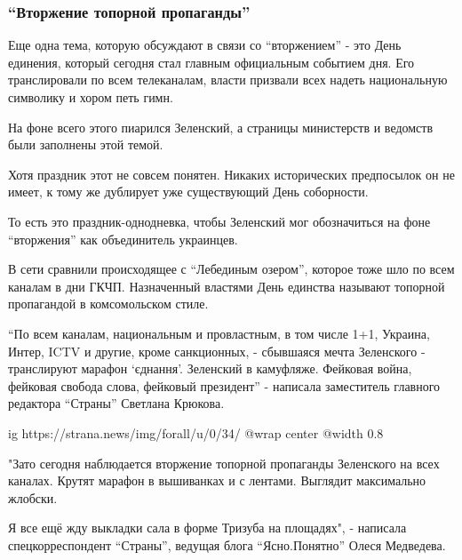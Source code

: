  
 
 
 
 

\subsubsection{\enquote{Вторжение топорной пропаганды}}
\label{sec:16_02_2022.stz.news.ua.strana.4.putin_ne_napal.4.vtorzhenie_propagandy}

Еще одна тема, которую обсуждают в связи со \enquote{вторжением} - это День единения,
который сегодня стал главным официальным событием дня. Его транслировали по
всем телеканалам, власти призвали всех надеть национальную символику и хором
петь гимн.

На фоне всего этого пиарился Зеленский, а страницы министерств и ведомств были
заполнены этой темой. 

Хотя праздник этот не совсем понятен. Никаких исторических предпосылок он не
имеет, к тому же дублирует уже существующий День соборности. 

То есть это праздник-однодневка, чтобы Зеленский мог обозначиться на фоне
\enquote{вторжения} как объединитель украинцев. 

В сети сравнили происходящее с \enquote{Лебединым озером}, которое тоже шло по всем
каналам в дни ГКЧП. Назначенный властями День единства называют топорной
пропагандой в комсомольском стиле.

\enquote{По всем каналам, национальным и провластным, в том числе 1+1, Украина, Интер,
ICTV и другие, кроме санкционных, - сбывшаяся мечта Зеленского - транслируют
марафон \enquote{єднання}. Зеленский в камуфляже. Фейковая война, фейковая свобода
слова, фейковый президент} - написала заместитель главного редактора \enquote{Страны}
Светлана Крюкова.

\ifcmt
  ig https://strana.news/img/forall/u/0/34/%
  @wrap center
  @width 0.8
\fi

"Зато сегодня наблюдается вторжение топорной пропаганды Зеленского на всех
каналах. Крутят марафон в вышиванках и с лентами. Выглядит максимально жлобски.

Я все ещё жду выкладки сала в форме Тризуба на площадях", - написала
спецкорреспондент \enquote{Страны}, ведущая блога \enquote{Ясно.Понятно} Олеся Медведева.

